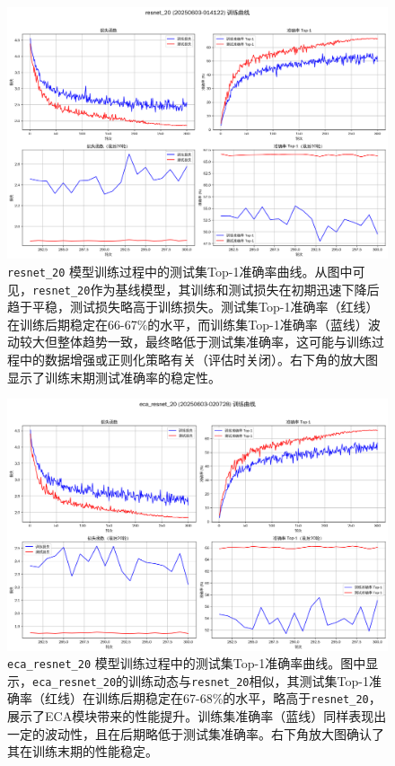 \documentclass[a4paper]{article}
\begin{document}
\begin{description}
\begin{figure}[H]
    \centering
    \includegraphics[width=\textwidth]{training_curves_resnet_20.png}
    \caption{\texttt{resnet\_20} 模型训练过程中的测试集Top-1准确率曲线。从图中可见，\texttt{resnet\_20}作为基线模型，其训练和测试损失在初期迅速下降后趋于平稳，测试损失略高于训练损失。测试集Top-1准确率（红线）在训练后期稳定在66-67\%的水平，而训练集Top-1准确率（蓝线）波动较大但整体趋势一致，最终略低于测试集准确率，这可能与训练过程中的数据增强或正则化策略有关（评估时关闭）。右下角的放大图显示了训练末期测试准确率的稳定性。}
    \label{fig:train_curve_resnet20}
\end{figure}

\begin{figure}[H]
    \centering
    \includegraphics[width=\textwidth]{training_curves_eca_resnet_20.png}
    \caption{\texttt{eca\_resnet\_20} 模型训练过程中的测试集Top-1准确率曲线。图中显示，\texttt{eca\_resnet\_20}的训练动态与\texttt{resnet\_20}相似，其测试集Top-1准确率（红线）在训练后期稳定在67-68\%的水平，略高于\texttt{resnet\_20}，展示了ECA模块带来的性能提升。训练集准确率（蓝线）同样表现出一定的波动性，且在后期略低于测试集准确率。右下角放大图确认了其在训练末期的性能稳定。}
    \label{fig:train_curve_ecaresnet20}
\end{figure}


\end{description}
\end{document}

